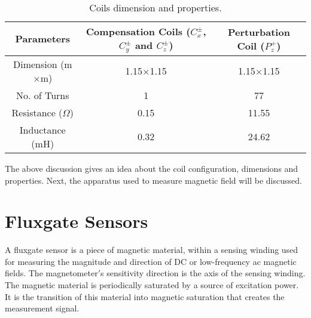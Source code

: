 \begin{table} [!htb]
    \centering
    \begin{tabular} { |c|c|c| } 
        \hline
        Parameters & \makecell{Compensation Coils \\ ($C_x^\pm$, $C_y^\pm$ and $C_z^\pm$)} & \makecell{Perturbation Coil \\ ($P_z^+$)} \\
        \hline\hline
        Dimension (m$\times$m) & 1.15$\times$1.15 & 1.15$\times$1.15\\ 
        \hline
        No. of Turns & 1 & 77\\ 
        \hline
        Resistance ($\Omega$) & 0.15 & 11.55\\ 
        \hline
        Inductance (mH) & 0.32 & 24.62\\
         \hline
    \end{tabular}
    \caption{Coils dimension and properties.}\label{table:coil}
\end{table}

\FloatBarrier
The above discussion gives an idea about the coil configuration, dimensions and properties. Next, the apparatus used to measure magnetic field will be discussed.


\section{Fluxgate Sensors}\label{sec:sensor}

A fluxgate sensor is a piece of magnetic material, within a sensing winding used for measuring the magnitude and direction of DC or low-frequency ac magnetic fields. The magnetometer$'$s sensitivity direction is the axis of the sensing winding. The magnetic material is periodically saturated by a source of excitation power. It is the transition of this material into magnetic saturation that creates the measurement signal.

